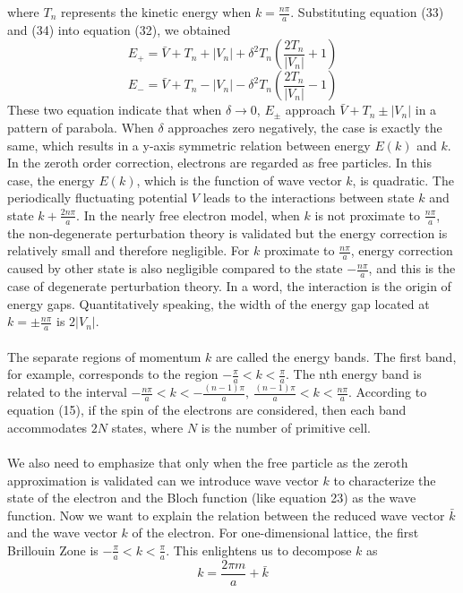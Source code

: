 \documentclass{article}
\begin{document}
where $T_n$ represents the kinetic energy when $k=\frac{n\pi}{a}$. Substituting equation (33) and (34) into equation (32), we obtained\begin{equation}
    E_+=\bar{V}+T_n+|V_n|+\delta^2T_n(\frac{2T_n}{|V_n|}+1)
\end{equation}\begin{equation}
    E_-=\bar{V}+T_n-|V_n|-\delta^2T_n(\frac{2T_n}{|V_n|}-1)
\end{equation}
These two equation indicate that when $\delta\rightarrow{0}$, $E_\pm$ approach $\bar{V}+T_n\pm|V_n|$ in a pattern of parabola. When $\delta$ approaches zero negatively, the case is exactly the same, which results in a y-axis symmetric relation between energy $E(k)$ and $k$. In the zeroth order correction, electrons are regarded as free particles. In this case, the energy $E(k)$, which is the function of wave vector $k$, is quadratic. The periodically fluctuating potential $V$ leads to the interactions between state $k$ and state $k+\frac{2n\pi}{a}$. In the nearly free electron model, when $k$ is not proximate to $\frac{n\pi}{a}$, the non-degenerate perturbation theory is validated but the energy correction is relatively small and therefore negligible. For $k$ proximate to $\frac{n\pi}{a}$, energy correction caused by other state is also negligible compared to the state $-\frac{n\pi}{a}$, and this is the case of degenerate perturbation theory. In a word, the interaction is the origin of energy gaps. Quantitatively speaking, the width of the energy gap located at $k=\pm\frac{n\pi}{a}$ is $2|V_n|$.\\
\\
The separate regions of momentum $k$ are called the energy bands. The first band, for example, corresponds to the region $-\frac{\pi}{a}<k<\frac{\pi}{a}$. The nth energy band is related to the interval $-\frac{n\pi}{a}<k<-\frac{(n-1)\pi}{a},~\frac{(n-1)\pi}{a}<k<\frac{n\pi}{a}$. According to equation (15), if the spin of the electrons are considered, then each band accommodates $2N$ states, where $N$ is the number of primitive cell.\\
\\
We also need to emphasize that only when the free particle as the zeroth approximation is validated can we introduce wave vector $k$ to characterize the state of the electron and the Bloch function (like equation 23) as the wave function. Now we want to explain the relation between the reduced wave vector $\bar{k}$ and the wave vector $k$ of the electron. For one-dimensional lattice, the first Brillouin Zone is $-\frac{\pi}{a}<k<\frac{\pi}{a}$. This enlightens us to decompose $k$ as\begin{equation}
    k=\frac{2\pi{m}}{a}+\bar{k}
\end{equation} 
\end{document}
